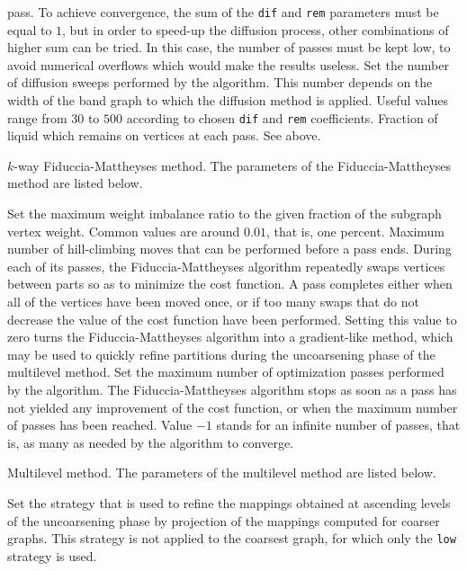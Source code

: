 \begin{itemize}
\begin{itemize}
pass. To achieve convergence, the sum of the {\tt dif} and {\tt rem}
parameters must be equal to $1$, but in order to speed-up the diffusion
process, other combinations of higher sum can be tried. In this case,
the number of passes must be kept low, to avoid numerical overflows
which would make the results useless.
\iteme[{\tt pass=}{\it nbr}]
Set the number of diffusion sweeps performed by the algorithm. This
number depends on the width of the band graph to which the diffusion
method is applied. Useful values range from $30$ to $500$ according
to chosen {\tt dif} and {\tt rem} coefficients.
\iteme[{\tt rem=}{\it rat}]
Fraction of liquid which remains on vertices at each pass. See above.
\end{itemize}
\iteme[{\tt f}]
$k$-way Fiduccia-Mattheyses method. The parameters of the
Fiduccia-Mattheyses method are listed below.
\begin{itemize}
\iteme[{\tt bal=}{\it rat}]
Set the maximum weight imbalance ratio to the given fraction of
the subgraph vertex weight. Common values are around $0.01$, that
is, one percent.
\iteme[{\tt move=}{\it nbr}]
Maximum number of hill-climbing moves that can be performed before a
pass ends. During each of its passes, the Fiduccia-Mattheyses
algorithm repeatedly swaps vertices between parts so as to
minimize the cost function. A pass completes either when all of the
vertices have been moved once, or if too many swaps that do not
decrease the value of the cost function have been performed. Setting
this value to zero turns the Fiduccia-Mattheyses algorithm into a
gradient-like method, which may be used to quickly refine partitions
during the uncoarsening phase of the multilevel method.
\iteme[{\tt pass=}{\it nbr}]
Set the maximum number of optimization passes performed by the
algorithm. The Fiduccia-Mattheyses algorithm stops as soon as a pass
has not yielded any improvement of the cost function, or when the
maximum number of passes has been reached. Value $-1$ stands for an
infinite number of passes, that is, as many as needed by the algorithm
to converge.
\end{itemize}
\iteme[{\tt m}]
Multilevel method. The parameters of the multilevel method are listed below.
\begin{itemize}
\iteme[{\tt asc=}{\it strat}]
Set the strategy that is used to refine the mappings obtained
at ascending levels of the uncoarsening phase by projection of the
mappings computed for coarser graphs.
This strategy is not applied to the coarsest graph, for which only the
{\tt low} strategy is used.
\iteme[{\tt low=}{\it strat}]

\end{itemize}
\end{itemize}
